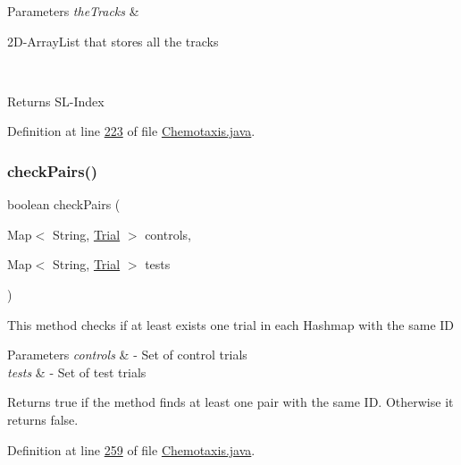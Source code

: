 \begin{DoxyParams}{Parameters}
{\em the\+Tracks} & 
\begin{DoxyItemize}
\item 2\+D-\/\+Array\+List that stores all the tracks 
\end{DoxyItemize}\\
\hline
\end{DoxyParams}
\begin{DoxyReturn}{Returns}
S\+L-\/\+Index 
\end{DoxyReturn}


Definition at line \hyperlink{_chemotaxis_8java_source_l00223}{223} of file \hyperlink{_chemotaxis_8java_source}{Chemotaxis.\+java}.

\hypertarget{classanalysis_1_1_chemotaxis_a1ebc6d4aaad3ec1c0eca87acb729ffb5}{}\label{classanalysis_1_1_chemotaxis_a1ebc6d4aaad3ec1c0eca87acb729ffb5} 
\subsubsection{\texorpdfstring{check\+Pairs()}{checkPairs()}}
{\footnotesize\ttfamily boolean check\+Pairs (\begin{DoxyParamCaption}\item[{Map$<$ String, \hyperlink{classdata_1_1_trial}{Trial} $>$}]{controls,  }\item[{Map$<$ String, \hyperlink{classdata_1_1_trial}{Trial} $>$}]{tests }\end{DoxyParamCaption})\hspace{0.3cm}{\ttfamily [private]}}

This method checks if at least exists one trial in each Hashmap with the same ID 
\begin{DoxyParams}{Parameters}
{\em controls} & -\/ Set of control trials \\
\hline
{\em tests} & -\/ Set of test trials \\
\hline
\end{DoxyParams}
\begin{DoxyReturn}{Returns}
true if the method finds at least one pair with the same ID. Otherwise it returns false. 
\end{DoxyReturn}


Definition at line \hyperlink{_chemotaxis_8java_source_l00259}{259} of file \hyperlink{_chemotaxis_8java_source}{Chemotaxis.\+java}.

